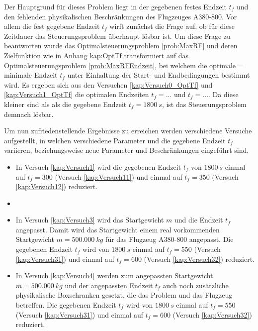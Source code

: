 Der Hauptgrund für dieses Problem liegt in der gegebenen festes Endzeit $t_f$ und den fehlenden physikalischen Beschränkungen des Flugzeuges A380-800. Vor allem die fest gegebene Endzeit $t_f$ wirft zunächst die Frage auf, ob für diese Zeitdauer das Steuerungsproblem überhaupt lösbar ist. Um diese Frage zu beantworten wurde das Optimalsteuerungsproblem \ref{prob:MaxRF} und deren Zielfunktion wie in Anhang {kap:OptTf} transformiert auf das Optimalsteuerungsproblem \ref{prob:MaxRFEndzeit}, bei welchem die optimale = minimale Endzeit $t_f$ unter Einhaltung der Start- und Endbedingungen bestimmt wird. Es ergeben sich aus den Versuchen \ref{kap:Versuch0_OptTf} und \ref{kap:Versuch1_OptTf} die optimalen Endzeiten $t_f = ...$ und $t_f = ...$. Da diese kleiner sind als als die gegebene Endzeit $t_f = 1800 \ s$, ist das Steuerungsproblem demnach lösbar.

Um nun zufriedenstellende Ergebnisse zu erreichen werden verschiedene Versuche aufgestellt, in welchen verschiedene Parameter und die gegebene Endzeit $t_f$ variieren, beziehungsweise neue Parameter und Beschränkungen eingeführt sind. 

\begin{itemize}
\item In Versuch \ref{kap:Versuch1} wird die gegebenen Endzeit $t_f$ von $1800 \ s$ einmal auf $t_f = 300$ (Versuch \ref{kap:Versuch11}) und einmal auf $t_f = 350$ (Versuch \ref{kap:Versuch12}) reduziert. 
%
\item 
%
\item In Versuch \ref{kap:Versuch3} wird das Startgewicht $m$ und die Endzeit $t_f$ angepasst. Damit wird das Startgewicht einem real vorkommenden Startgewicht $m = 500.000 \ kg$ für das Flugzeug A380-800 angepasst. Die gegebenen Endzeit $t_f$ wird von $1800 \ s$ einmal auf $t_f = 550$ (Versuch \ref{kap:Versuch31}) und einmal auf $t_f = 600$ (Versuch \ref{kap:Versuch32}) reduziert.
%
\item In Versuch \ref{kap:Versuch4} werden zum angepassten Startgewicht $m = 500.000 \ kg$ und der angepassten Endzeit $t_f$ auch noch zusätzliche physikalische Boxschranken gesetzt, die das Problem und das Flugzeug betreffen. Die gegebenen Endzeit $t_f$ wird von $1800 \ s$ einmal auf $t_f = 550$ (Versuch \ref{kap:Versuch31}) und einmal auf $t_f = 600$ (Versuch \ref{kap:Versuch32}) reduziert.
\end{itemize}














